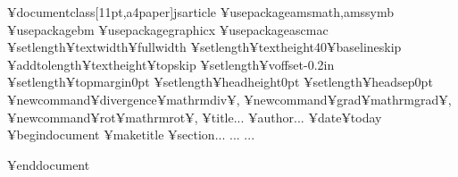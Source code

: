 ¥documentclass[11pt,a4paper]{jsarticle}
%
¥usepackage{amsmath,amssymb}
¥usepackage{bm}
¥usepackage{graphicx}
¥usepackage{ascmac}
%
¥setlength{¥textwidth}{¥fullwidth}
¥setlength{¥textheight}{40¥baselineskip}
¥addtolength{¥textheight}{¥topskip}
¥setlength{¥voffset}{-0.2in}
¥setlength{¥topmargin}{0pt}
¥setlength{¥headheight}{0pt}
¥setlength{¥headsep}{0pt}
%
¥newcommand{¥divergence}{¥mathrm{div}¥,}
¥newcommand{¥grad}{¥mathrm{grad}¥,}
¥newcommand{¥rot}{¥mathrm{rot}¥,}
%
¥title{...}
¥author{...}
¥date{¥today}
¥begin{document}
¥maketitle
%
%
¥section{...}
...
...

%
%
¥end{document}
